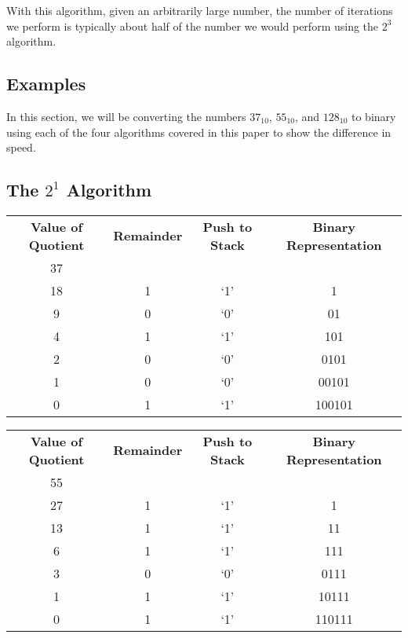\documentclass[12pt]{article}
\begin{document}
\par With this algorithm, given an arbitrarily large number, the number of iterations we perform is typically about half of the number we would perform using the $2^3$ algorithm.



\newpage %



\begin{center}
  \section{Examples}
\end{center}
In this section, we will be converting the numbers $37_{10}$, $55_{10}$, and $128_{10}$ to binary using each of the four algorithms covered in this paper to show the difference in speed.
\subsection{The $2^1$ Algorithm}
\begin{center}
  \begin{tabular}{c|c|c|c}
    \textbf{Value of Quotient} & \textbf{Remainder} & \textbf{Push to Stack} & \textbf{Binary Representation} \\
    37 &   &     & \\
    18 & 1 & `1' & 1 \\
    9  & 0 & `0' & 01 \\
    4  & 1 & `1' & 101 \\
    2  & 0 & `0' & 0101 \\
    1  & 0 & `0' & 00101 \\
    0  & 1 & `1' & 100101
  \end{tabular}
\end{center}

\begin{center}
  \begin{tabular}{c|c|c|c}
    \textbf{Value of Quotient} & \textbf{Remainder} & \textbf{Push to Stack} & \textbf{Binary Representation} \\
    55 &   &     & \\
    27 & 1 & `1' & 1 \\
    13 & 1 & `1' & 11 \\
    6  & 1 & `1' & 111 \\
    3  & 0 & `0' & 0111 \\
    1  & 1 & `1' & 10111 \\
    0  & 1 & `1' & 110111
  \end{tabular}
\end{center}
\end{document}
